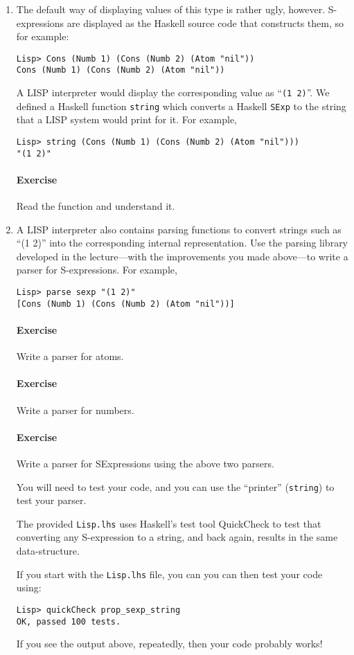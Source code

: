 \documentclass{article}
\newcommand{\percents}[1]{\protect \marginpar[l]{\bf [#1 points]}}
\newcounter{question}
\newcommand{\question}[2]{
  \addtocounter{question}{1}
  \paragraph{Exercise~\arabic{question}  \percents{#1}}
   #2
  \vfil
 }
\begin{document}
\begin{enumerate}
\item
The default way of displaying values of this type is rather ugly,
however. S-expressions are displayed as the Haskell source code that
constructs them, so for example:
\begin{verbatim}
Lisp> Cons (Numb 1) (Cons (Numb 2) (Atom "nil"))
Cons (Numb 1) (Cons (Numb 2) (Atom "nil"))
\end{verbatim}
A LISP interpreter would display the corresponding value as
``\verb!(1 2)!''. We defined a Haskell function \verb!string! which
converts a Haskell \verb!SExp! to the string that a LISP system would
print for it. For example,
\begin{verbatim}
Lisp> string (Cons (Numb 1) (Cons (Numb 2) (Atom "nil")))
"(1 2)"
\end{verbatim}
\question{0}{Read the function and understand it.}
\item
A LISP interpreter also contains parsing functions to convert strings
such as ``(1 2)'' into the corresponding internal representation. Use
the parsing library developed in the lecture---with the improvements
you made above---to write a parser for S-expressions. For example,
\begin{verbatim}
Lisp> parse sexp "(1 2)"
[Cons (Numb 1) (Cons (Numb 2) (Atom "nil"))]
\end{verbatim}

\question{1}{Write a parser for atoms.}
\question{1}{Write a parser for numbers.}
\question{3}{Write a parser for SExpressions using the above two parsers.}

You will need to test your code, and you can use the ``printer''
(\verb!string!) to test your parser. 

The provided \verb!Lisp.lhs! uses Haskell's test tool QuickCheck to
test that converting any S-expression to a string, and back again,
results in the same data-structure. 

If you start with the \verb!Lisp.lhs! file, you can you can then test your code
using:
\begin{verbatim}
Lisp> quickCheck prop_sexp_string
OK, passed 100 tests.
\end{verbatim}
If you see the output above, repeatedly, then your code probably works!
\end{enumerate}
\end{document}
